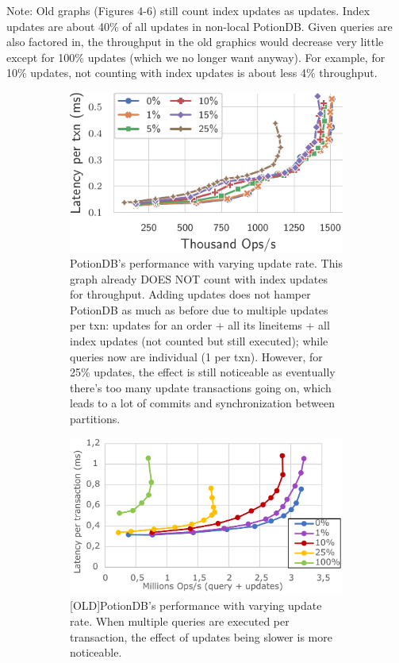 \documentclass[sigplan,10pt]{acmart}
\begin{document}
Note: Old graphs (Figures 4-6) still count index updates as updates. 
Index updates are about 40\% of all updates in non-local PotionDB.
Given queries are also factored in, the throughput in the old graphics would decrease very little except for 100\% updates (which we no longer want anyway).
For example, for 10\% updates, not counting with index updates is about less 4\% throughput.

\begin{figure}[h]
	\centering
	\begin{subfigure}{.47\linewidth}
		\includegraphics[width=1\linewidth]{singleQuery/upd_rate_global_noTC}
		\caption{PotionDB's performance with varying update rate. This graph already DOES NOT count with index updates for throughput. Adding updates does not hamper PotionDB as much as before due to multiple updates per txn: updates for an order + all its lineitems + all index updates (not counted but still executed); while queries now are individual (1 per txn). However, for 25\% updates, the effect is still noticeable as eventually there's too many update transactions going on, which leads to a lot of commits and synchronization between partitions.}
		\label{fig:(new)update_rates}
	\end{subfigure}%
	\hspace*{3em}
	\begin{subfigure}{.47\linewidth}
		\includegraphics[width=1\linewidth]{updRate_global_cut}
		\caption{[OLD]PotionDB's performance with varying update rate. When multiple queries are executed per transaction, the effect of updates being slower is more noticeable.}
		\label{fig:(old)update_rates}
	\end{subfigure}
	\caption{}
\end{figure}
\end{document}
